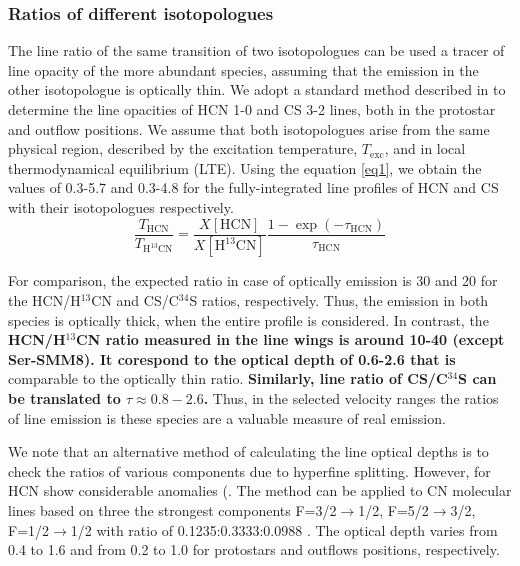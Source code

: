 \documentclass{aa}
\begin{document}
\subsubsection{Ratios of different isotopologues}
 
The line ratio of the same transition of two isotopologues can be used a tracer of 
line opacity of the more abundant species, assuming that the emission in the 
other isotopologue is optically thin. We adopt a standard method described in \citep{Gol84} 
to determine the line opacities of HCN 1-0 and CS 3-2 lines, both in the protostar 
and outflow positions. We assume that both isotopologues arise from the 
same physical region, described by the excitation temperature, $T_\mathrm{exc}$, and 
in local thermodynamical equilibrium (LTE). Using the equation \ref{eq1}, we obtain
the values of 0.3-5.7 and 0.3-4.8 for the fully-integrated line profiles of HCN and CS with their isotopologues respectively.
\begin{equation} 
\label{eq1} \frac{T_{\mathrm{HCN}}}{T_{\mathrm{H^{13}CN}}} =
\frac{X[\mathrm{HCN}]}{X[\mathrm{H^{13}CN}]} \frac
{1-\exp(-\tau_{\mathrm{HCN}})}{\tau_{\mathrm{HCN}}} 
\end{equation} 

For comparison, the expected ratio in case of optically emission is 30 and 20 for 
the HCN/H$^{13}$CN \citep{Dan13} and CS/C$^{34}$S \citep{Ter10} ratios, respectively. Thus, 
the emission in both species is optically thick, when the entire profile is considered.
In contrast, the \textbf{HCN/H$^13$CN ratio measured in the line wings is around 10-40 (except Ser-SMM8). It corespond to the optical depth of 0.6-2.6 that is} comparable to the optically thin ratio. \textbf{Similarly, line ratio of CS/C$^{34}$S can be translated to $\tau \approx 0.8-2.6$.} Thus, in the selected velocity ranges the ratios of line emission
is these species are a valuable measure of real emission. 

We note that an alternative method of calculating the line optical depths is to check 
the ratios of various components due to hyperfine splitting. However, for HCN show 
considerable anomalies (\citep{Lou12}. The method can be applied to CN molecular lines based on three the strongest components F=3/2$\rightarrow$1/2, F=5/2$\rightarrow$3/2, F=1/2$\rightarrow$1/2 with ratio of 0.1235:0.3333:0.0988 \citep{Ska83}. The optical depth varies from 0.4 to 1.6 and from 0.2 to 1.0 for protostars and outflows positions, respectively. 
\end{document}

